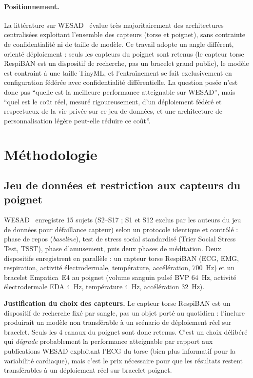 \documentclass{acmart}
\begin{document}
\paragraph{Positionnement.} La littérature sur WESAD~\cite{schmidt2018wesad}
évalue très majoritairement des architectures centralisées exploitant
l'ensemble des capteurs (torse et poignet), sans contrainte de confidentialité
ni de taille de modèle. Ce travail adopte un angle différent, orienté
déploiement : seuls les capteurs du poignet sont retenus (le capteur torse
RespiBAN est un dispositif de recherche, pas un bracelet grand public), le
modèle est contraint à une taille TinyML, et l'entraînement se fait
exclusivement en configuration fédérée avec confidentialité différentielle.
La question posée n'est donc pas ``quelle est la meilleure performance
atteignable sur WESAD'', mais ``quel est le coût réel, mesuré rigoureusement,
d'un déploiement fédéré et respectueux de la vie privée sur ce jeu de
données, et une architecture de personnalisation légère peut-elle réduire ce
coût''.

\section{Méthodologie}
\label{sec:method}

\subsection{Jeu de données et restriction aux capteurs du poignet}

WESAD~\cite{schmidt2018wesad} enregistre 15 sujets (S2--S17 ; S1 et S12
exclus par les auteurs du jeu de données pour défaillance capteur) selon un
protocole identique et contrôlé : phase de repos (\textit{baseline}), test de
stress social standardisé (Trier Social Stress Test, TSST), phase
d'amusement, puis deux phases de méditation. Deux dispositifs enregistrent en
parallèle : un capteur torse RespiBAN (ECG, EMG, respiration, activité
électrodermale, température, accélération, 700~Hz) et un bracelet Empatica~E4
au poignet (volume sanguin pulsé BVP 64~Hz, activité électrodermale EDA 4~Hz,
température 4~Hz, accélération 32~Hz).

\textbf{Justification du choix des capteurs.} Le capteur torse RespiBAN est
un dispositif de recherche fixé par sangle, pas un objet porté au quotidien :
l'inclure produirait un modèle non transférable à un scénario de déploiement
réel sur bracelet. Seuls les 4 canaux du poignet sont donc retenus. C'est un
choix délibéré qui \emph{dégrade} probablement la performance atteignable par
rapport aux publications WESAD exploitant l'ECG du torse (bien plus
informatif pour la variabilité cardiaque), mais c'est le prix nécessaire pour
que les résultats restent transférables à un déploiement réel sur bracelet
poignet.
\end{document}

